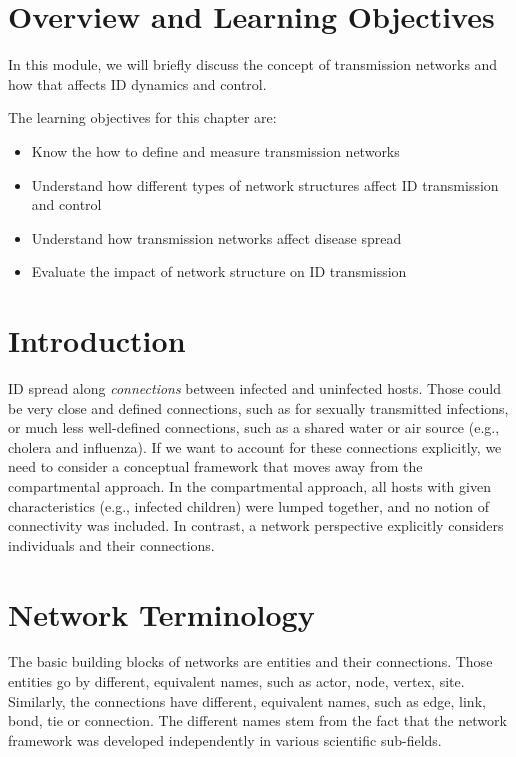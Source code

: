 \documentclass[]{book}
\providecommand{\tightlist}{%
  \setlength{\itemsep}{0pt}\setlength{\parskip}{0pt}}
\theoremstyle{definition}
\theoremstyle{definition}
\theoremstyle{definition}
\theoremstyle{remark}
\begin{document}
\section{Overview and Learning
Objectives}\label{overview-and-learning-objectives-13}

In this module, we will briefly discuss the concept of transmission
networks and how that affects ID dynamics and control.

The learning objectives for this chapter are:

\begin{itemize}
\tightlist
\item
  Know the how to define and measure transmission networks
\item
  Understand how different types of network structures affect ID
  transmission and control
\item
  Understand how transmission networks affect disease spread
\item
  Evaluate the impact of network structure on ID transmission
\end{itemize}

\section{Introduction}\label{introduction-12}

ID spread along \emph{connections} between infected and uninfected
hosts. Those could be very close and defined connections, such as for
sexually transmitted infections, or much less well-defined connections,
such as a shared water or air source (e.g., cholera and influenza). If
we want to account for these connections explicitly, we need to consider
a conceptual framework that moves away from the compartmental approach.
In the compartmental approach, all hosts with given characteristics
(e.g., infected children) were lumped together, and no notion of
connectivity was included. In contrast, a network perspective explicitly
considers individuals and their connections.

\section{Network Terminology}\label{network-terminology}

The basic building blocks of networks are entities and their
connections. Those entities go by different, equivalent names, such as
actor, node, vertex, site. Similarly, the connections have different,
equivalent names, such as edge, link, bond, tie or connection. The
different names stem from the fact that the network framework was
developed independently in various scientific sub-fields.
\end{document}
